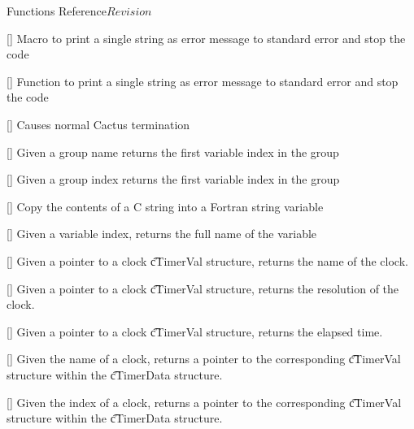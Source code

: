 \begin{cactuspart}{ Functions Reference}{}{$Revision$}
\begin{Lentry}
\item[\code{CCTK\_ERROR}] [\pageref{CCTK-ERROR}]
  Macro to print a single string as error message to standard error
  and stop the code

\item[\code{CCTK\_Error}] [\pageref{CCTK-Error}]
  Function to print a single string as error message to standard error
  and stop the code

\item[\code{CCTK\_Exit}] [\pageref{CCTK-Exit}]
  Causes normal Cactus termination

\item[\code{CCTK\_FirstVarIndex}] [\pageref{CCTK-FirstVarIndex}]
  Given a group name returns the first variable index in the group

\item[\code{CCTK\_FirstVarIndexI}] [\pageref{CCTK-FirstVarIndexI}]
  Given a group index returns the first variable index in the group

\item[\code{CCTK\_FortranString}] [\pageref{CCTK-FortranString}]
  Copy the contents of a C string into a Fortran string variable

\item[\code{CCTK\_FullName}] [\pageref{CCTK-FullName}]
  Given a variable index, returns the full name of the variable

\item[\code{CCTK\_GetClockName}] [\pageref{CCTK-GetClockName}]
  Given a pointer to a clock {\t cTimerVal} structure, returns the name
  of the clock.

\item[\code{CCTK\_GetClockResolution}] [\pageref{CCTK-GetClockResolution}]
  Given a pointer to a clock {\t cTimerVal} structure, returns the resolution
  of the clock.

\item[\code{CCTK\_GetClockSeconds}] [\pageref{CCTK-GetClockSeconds}]
  Given a pointer to a clock {\t cTimerVal} structure, returns the elapsed time.

\item[\code{CCTK\_GetClockValue}] [\pageref{CCTK-GetClockValue}]
  Given the name of a clock, returns a pointer to the corresponding
  {\t cTimerVal} structure within the {\t cTimerData} structure.

\item[\code{CCTK\_GetClockValueI}] [\pageref{CCTK-GetClockValueI}]
  Given the index of a clock, returns a pointer to the corresponding
  {\t cTimerVal} structure within the {\t cTimerData} structure.


\end{Lentry}
\end{cactuspart}
